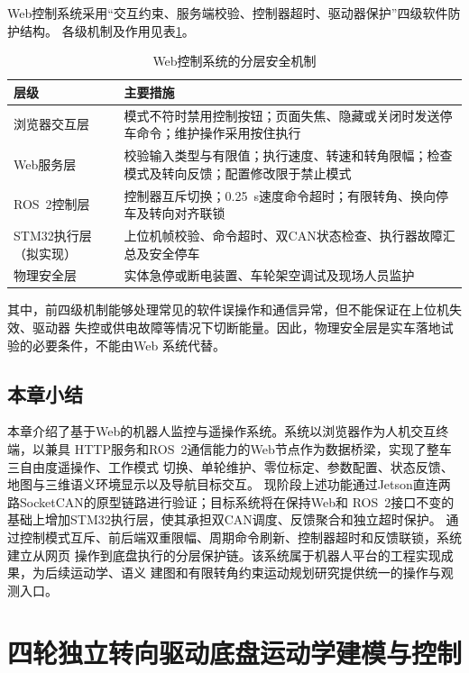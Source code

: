 \documentclass[UTF8,12pt,a4paper,openany]{ctexbook}
\begin{document}
Web控制系统采用“交互约束、服务端校验、控制器超时、驱动器保护”四级软件防护结构。
各级机制及作用见表\ref{tab:web-safety}。

\begin{table}[htbp]
    \centering
    \caption{Web控制系统的分层安全机制}
    \label{tab:web-safety}
    \begin{tabularx}{\textwidth}{p{3.0cm}X}
        \toprule
        层级 & 主要措施 \\
        \midrule
        浏览器交互层 & 模式不符时禁用控制按钮；页面失焦、隐藏或关闭时发送停车命令；维护操作采用按住执行 \\
        Web服务层 & 校验输入类型与有限值；执行速度、转速和转角限幅；检查模式及转向反馈；配置修改限于禁止模式 \\
        ROS~2控制层 & 控制器互斥切换；0.25~s速度命令超时；有限转角、换向停车及转向对齐联锁 \\
        STM32执行层（拟实现） & 上位机帧校验、命令超时、双CAN状态检查、执行器故障汇总及安全停车 \\
        物理安全层 & 实体急停或断电装置、车轮架空调试及现场人员监护 \\
        \bottomrule
    \end{tabularx}
\end{table}

其中，前四级机制能够处理常见的软件误操作和通信异常，但不能保证在上位机失效、驱动器
失控或供电故障等情况下切断能量。因此，物理安全层是实车落地试验的必要条件，不能由Web
系统代替。

\section{本章小结}

本章介绍了基于Web的机器人监控与遥操作系统。系统以浏览器作为人机交互终端，以兼具
HTTP服务和ROS~2通信能力的Web节点作为数据桥梁，实现了整车三自由度遥操作、工作模式
切换、单轮维护、零位标定、参数配置、状态反馈、地图与三维语义环境显示以及导航目标交互。
现阶段上述功能通过Jetson直连两路SocketCAN的原型链路进行验证；目标系统将在保持Web和
ROS~2接口不变的基础上增加STM32执行层，使其承担双CAN调度、反馈聚合和独立超时保护。
通过控制模式互斥、前后端双重限幅、周期命令刷新、控制器超时和反馈联锁，系统建立从网页
操作到底盘执行的分层保护链。该系统属于机器人平台的工程实现成果，为后续运动学、语义
建图和有限转角约束运动规划研究提供统一的操作与观测入口。


\chapter{四轮独立转向驱动底盘运动学建模与控制}
\label{chap:kinematics-control}
\end{document}
